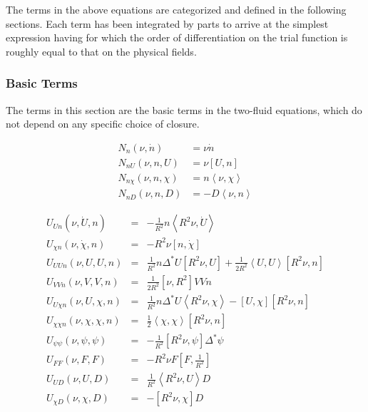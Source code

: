 \documentclass[letterpaper]{book}
\newcommand{\gs}[1]{\Delta^* #1}
\newcommand{\pb}[2]{\left[#1,#2\right]}
\newcommand{\ip}[2]{\left\langle  #1,#2\right\rangle}
\begin{document}
The terms in the above equations are categorized and defined in the
following sections.  Each term has been integrated by parts to arrive
at the simplest expression having for which the order of
differentiation on the trial function is roughly equal to that on the
physical fields.

\subsubsection{Basic Terms}

The terms in this section are the basic terms in the two-fluid
equations, which do not depend on any specific choice of closure.

\begin{equation}
  \begin{array}{ll}
  N_n(\nu, \dot{n}) & = \nu \dot{n}\\
  N_{n U}(\nu, n, U) & = \nu \pb{U}{n}\\
  N_{n \chi}(\nu, n, \chi) & = n \ip{\nu}{\chi}\\
  N_{n D}(\nu, n, D) & = - D \ip{\nu}{n}
  \end{array}
\end{equation}

\begin{equation}
  \begin{array}{lcl}
    U_{U n}(\nu, \dot U, n) & = & -\frac{1}{R^2} n \ip{R^2 \nu}{\dot{U}}
    \\
    U_{\chi n}(\nu, \dot \chi, n) & = & -R^2 \nu \pb{n}{\dot{\chi}}
    \\
    U_{U U n}(\nu, U, U, n) & = & \frac{1}{R^2} n \gs{U} \pb{R^2\nu}{U}
      + \frac{1}{2 R^2} \ip{U}{U}\pb{R^2\nu}{n}
    \\
    U_{V V n}(\nu, V,  V, n) & = &  \frac{1}{2 R^2} \pb{\nu}{R^2} V V n
    \\
    U_{U \chi n}(\nu, U, \chi, n) & = & 
      \frac{1}{R^2}n \gs{U}\ip{R^2\nu}{\chi} 
      - \pb{U}{\chi} \pb{R^2\nu}{n}
    \\
    U_{\chi \chi n}(\nu, \chi, \chi, n) & = &
      \frac{1}{2} \ip{\chi}{\chi} \pb{R^2 \nu}{n}
    \\
    U_{\psi \psi}(\nu, \psi, \psi) & = &
      -\frac{1}{R^2} \pb{R^2 \nu}{\psi} \gs{\psi}
    \\
    U_{F F}(\nu, F, F) & = & -R^2 \nu F \pb{F}{\frac{1}{R^2}}
    \\
    U_{U D}(\nu, U, D) & = & \frac{1}{R^2} \ip{R^2 \nu}{U} D
    \\
    U_{\chi D}(\nu, \chi, D) & = & -\pb{R^2 \nu}{\chi} D
  \end{array}
\end{equation}
\end{document}
